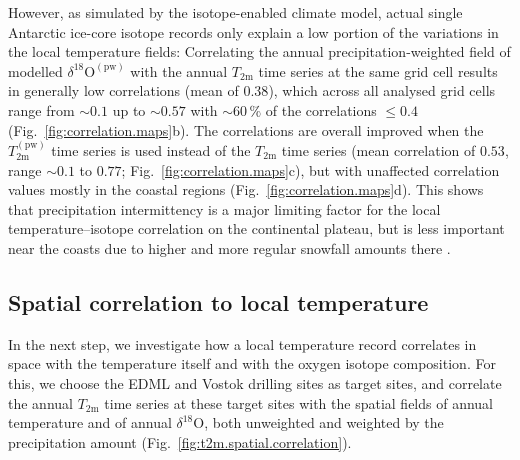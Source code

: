 \documentclass[cp, manuscript]{copernicus}
\begin{document}
However, as simulated by the isotope-enabled climate model, actual single
Antarctic ice-core isotope records only explain a low portion of the variations
in the local temperature fields: Correlating the annual precipitation-weighted
field of modelled $\delta^{18}\mathrm{O}^{\mathrm{(pw)}}$ with the annual
$T_{2\mathrm{m}}$ time series at the same grid cell results in generally low
correlations (mean of $0.38$), which across all analysed grid cells range from
$\sim0.1$ up to $\sim0.57$ with $\sim60\,\%$ of the correlations $\leq0.4$
(Fig.~\ref{fig:correlation.maps}b). The correlations are overall improved when
the $T_{2\mathrm{m}}^{\mathrm{(pw)}}$ time series is used instead of the
$T_{2\mathrm{m}}$ time series (mean correlation of $0.53$, range $\sim0.1$ to
$0.77$; Fig.~\ref{fig:correlation.maps}c), but with unaffected correlation
values mostly in the coastal regions (Fig.~\ref{fig:correlation.maps}d). This
shows that precipitation intermittency is a major limiting factor for the local
temperature--isotope correlation on the continental plateau, but is less
important near the coasts due to higher and more regular snowfall amounts there
\citep{Casado2020}.

\subsection{Spatial correlation to local temperature}
\label{results:t2m.spatial.correlation}

In the next step, we investigate how a local temperature record correlates in
space with the temperature itself and with the oxygen isotope composition. For
this, we choose the EDML and Vostok drilling sites as target sites, and
correlate the annual $T_{2\mathrm{m}}$ time series at these target sites with
the spatial fields of annual temperature and of annual $\delta^{18}\mathrm{O}$,
both unweighted and weighted by the precipitation amount
(Fig.~\ref{fig:t2m.spatial.correlation}).
\end{document}

